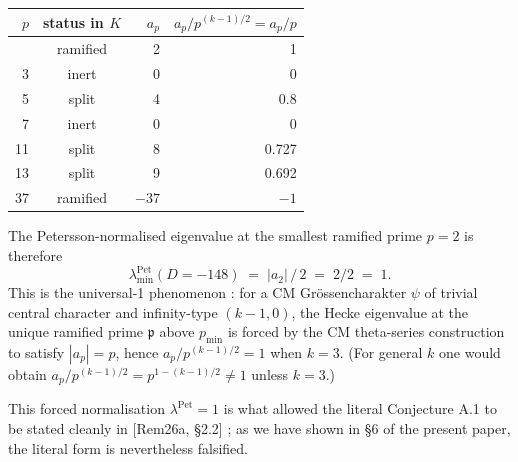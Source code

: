 \documentclass[
  11pt,
  a4paper,
]{amsart}
\begin{document}
\begin{longtable}[]{@{}rcrr@{}}
\toprule\noalign{}
\(p\) & status in \(K\) & \(a_p\) & \(a_p / p^{(k-1)/2} = a_p / p\) \\
\midrule\noalign{}
\endhead
\bottomrule\noalign{}
\endlastfoot
2 & ramified & 2 & 1 \\
3 & inert & 0 & 0 \\
5 & split & 4 & 0.8 \\
7 & inert & 0 & 0 \\
11 & split & 8 & 0.727 \\
13 & split & 9 & 0.692 \\
37 & ramified & \(-37\) & \(-1\) \\
\end{longtable}

The Petersson-normalised eigenvalue at the smallest ramified prime \(p = 2\) is therefore
\[
\lambda_{\min}^{\mathrm{Pet}}(D = -148) \;=\; |a_2|\,/\,2 \;=\; 2/2 \;=\; 1.
\]
This is the universal-1 phenomenon : for a CM Grössencharakter \(\psi\) of trivial central character and infinity-type \((k-1, 0)\), the Hecke eigenvalue at the unique ramified prime \(\mathfrak p\) above \(p_{\min}\) is forced by the CM theta-series construction to satisfy \(|a_p| = p\), hence \(a_p / p^{(k-1)/2} = 1\) when \(k = 3\). (For general \(k\) one would obtain \(a_p / p^{(k-1)/2} = p^{1 - (k-1)/2} \neq 1\) unless \(k = 3\).)

This forced normalisation \(\lambda^{\mathrm{Pet}} = 1\) is what allowed the literal Conjecture A.1 to be stated cleanly in {[}Rem26a, §2.2{]} ; as we have shown in §6 of the present paper, the literal form is nevertheless falsified.
\end{document}
